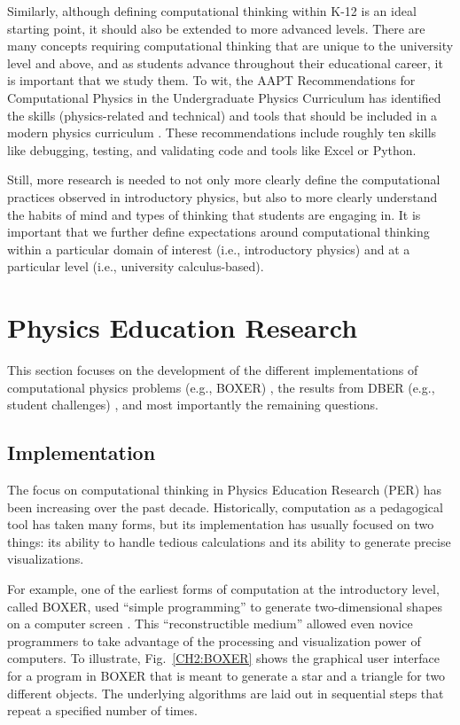 \documentclass{msuphddissertation}
\begin{document}
\begin{doublespace}
Similarly, although defining computational thinking within K-12 is an ideal starting point, it should also be extended to more advanced levels.  There are many concepts requiring computational thinking that are unique to the university level and above, and as students advance throughout their educational career, it is important that we study them.  To wit, the AAPT Recommendations for Computational Physics in the Undergraduate Physics Curriculum has identified the skills (physics-related and technical) and tools that should be included in a modern physics curriculum \cite{AAPT2016}.  These recommendations include roughly ten skills like debugging, testing, and validating code and tools like Excel or Python.

Still, more research is needed to not only more clearly define the computational practices observed in introductory physics, but also to more clearly understand the habits of mind and types of thinking that students are engaging in.  It is important that we further define expectations around computational thinking within a particular domain of interest (i.e., introductory physics) and at a particular level (i.e., university calculus-based).

\section{Physics Education Research}

This section focuses on the development of the different implementations of computational physics problems (e.g., BOXER) \cite{DiSessa1986,Redish1992,Chonacky2008,McIntyre2008}, the results from DBER (e.g., student challenges) \cite{Chabay2008,Buffler2008,Belloni2008,Hoover2008,Cook2008,Weiman2008}, and most importantly the remaining questions.

\subsection{Implementation}

The focus on computational thinking in Physics Education Research (PER) has been increasing over the past decade.  Historically, computation as a pedagogical tool has taken many forms, but its implementation has usually focused on two things: its ability to handle tedious calculations and its ability to generate precise visualizations.

For example, one of the earliest forms of computation at the introductory level, called BOXER, used ``simple programming'' to generate two-dimensional shapes on a computer screen \cite{DiSessa1986}.  This ``reconstructible medium'' allowed even novice programmers to take advantage of the processing and visualization power of computers.  To illustrate, Fig.~\ref{CH2:BOXER} shows the graphical user interface for a program in BOXER that is meant to generate a star and a triangle for two different objects.  The underlying algorithms are laid out in sequential steps that repeat a specified number of times.


\end{doublespace}
\end{document}
